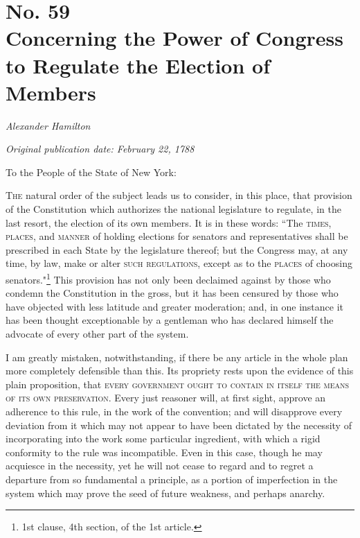 \chapter[No. 59: Concerning the Power of Congress to Regulate the Election of Members]{No. 59\\ {\small Concerning the Power of Congress to Regulate the Election of Members}}

\textit{Alexander Hamilton}

\textit{Original publication date: February 22, 1788}
\vspace{1cm}

To the People of the State of New York:
\vspace{.4cm}

\textsc{The} natural order of the subject leads us to consider, in this place, that provision of the Constitution which authorizes the national legislature to regulate, in the last resort, the election of its own members. 
It is in these words: ``The \textsc{times}, \textsc{places}, and \textsc{manner} of holding elections for senators and representatives shall be prescribed in each State by the legislature thereof; but the Congress may, at any time, by law, make or alter \textsc{such regulations}, except as to the \textsc{places} of choosing senators."\footnote{1st clause, 4th section, of the 1st article.} This provision has not only been declaimed against by those who condemn the Constitution in the gross, but it has been censured by those who have objected with less latitude and greater moderation; and, in one instance it has been thought exceptionable by a gentleman who has declared himself the advocate of every other part of the system.

I am greatly mistaken, notwithstanding, if there be any article in the whole plan more completely defensible than this. 
Its propriety rests upon the evidence of this plain proposition, that \textsc{every government ought to contain in itself the means of its own preservation}. 
Every just reasoner will, at first sight, approve an adherence to this rule, in the work of the convention; and will disapprove every deviation from it which may not appear to have been dictated by the necessity of incorporating into the work some particular ingredient, with which a rigid conformity to the rule was incompatible. 
Even in this case, though he may acquiesce in the necessity, yet he will not cease to regard and to regret a departure from so fundamental a principle, as a portion of imperfection in the system which may prove the seed of future weakness, and perhaps anarchy.

